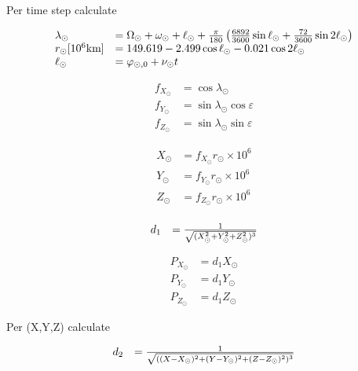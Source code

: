\documentclass{article}
\begin{document}
Per time step calculate

\begin{equation}
\begin{array}{ll}
\lambda_\odot &= \Omega_\odot+\omega_\odot+\ell_{\odot}+\frac{\pi}{180}\left(
{6892\over3600} \sin \ell_{\odot} + {72\over 3600} \sin 2\ell_{\odot}\right)\\
r_\odot[10^6\mbox{km}] &=149.619-2.499 \cos \ell_{\odot} - 0.021 \cos 2\ell_{\odot}\\
\ell_{\odot} &= \varphi_{\odot,0}+\nu_\odot t
\end{array}
\end{equation}

\begin{equation}
\begin{array}{ll}
f_{X_{\odot}} &=\cos \lambda_\odot \\
f_{Y_{\odot}} &=\sin \lambda_\odot \cos \varepsilon \\
f_{Z_{\odot}} &=\sin \lambda_\odot \sin \varepsilon
\end{array}
\end{equation}

\begin{equation}
\begin{array}{ll}
X_{\odot} &= f_{X_{\odot}}r_\odot\times 10^{6} \\
Y_{\odot} &= f_{Y_{\odot}}r_\odot\times 10^{6} \\
Z_{\odot} &= f_{Z_{\odot}}r_\odot\times 10^{6} \\
\end{array}
\end{equation}

\begin{equation}
\begin{array}{ll}
d_1 &= {1 \over \sqrt{(X_\odot^2+Y_\odot^2+Z_\odot^2)^3}}
\end{array}
\end{equation}

\begin{equation}
\begin{array}{ll}
P_{X_{\odot}} &= d_1X_{\odot} \\
P_{Y_{\odot}} &= d_1Y_{\odot} \\
P_{Z_{\odot}} &= d_1Z_{\odot}
\end{array}
\end{equation}

Per (X,Y,Z) calculate

\begin{equation}
\begin{array}{ll}
d_2 &= {1 \over \sqrt{((X-X_\odot)^2+(Y-Y_\odot)^2+(Z-Z_\odot)^2)^3}}
\end{array}
\end{equation}
\end{document}
